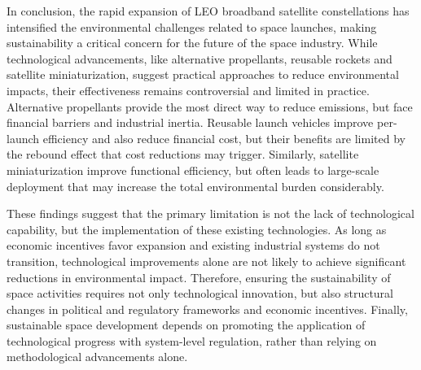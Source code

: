 \documentclass[12pt]{article}
\begin{document}
In conclusion, the rapid expansion of LEO broadband satellite constellations has intensified the environmental challenges related to space launches, making sustainability a critical concern for the future of the space industry. While technological advancements, like alternative propellants, reusable rockets and satellite miniaturization, suggest practical approaches to reduce environmental impacts, their effectiveness remains controversial and limited in practice. Alternative propellants provide the most direct way to reduce emissions, but face financial barriers and industrial inertia. Reusable launch vehicles improve per-launch efficiency and also reduce financial cost, but their benefits are limited by the rebound effect that cost reductions may trigger. Similarly, satellite miniaturization improve functional efficiency, but often leads to large-scale deployment that may increase the total environmental burden considerably.


These findings suggest that the primary limitation is not the lack of technological capability, but the implementation of these existing technologies. As long as economic incentives favor expansion and existing industrial systems do not transition, technological improvements alone are not likely to achieve significant reductions in environmental impact. Therefore, ensuring the sustainability of space activities requires not only technological innovation, but also structural changes in political and regulatory frameworks and economic incentives. Finally, sustainable space development depends on promoting the application of technological progress with system-level regulation, rather than relying on methodological advancements alone.





\newpage


\end{document}
